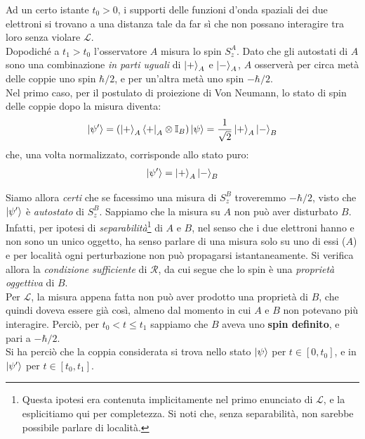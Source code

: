 \documentclass[../../FisicaTeorica.tex]{subfiles}
\begin{document}
Ad un certo istante $t_0 > 0$, i supporti delle funzioni d'onda spaziali dei due elettroni si trovano a una distanza tale da far sì che non possano interagire tra loro senza violare $\mathcal{L}$.\\
Dopodiché a $t_1>t_0$ l'osservatore $A$ misura lo spin $S_z^A$. Dato che gli autostati di $A$ sono una combinazione \textit{in parti uguali} di $\Ket{+}_A$ e $\Ket{-}_A$, $A$ osserverà per circa metà delle coppie uno spin $\hbar/2$, e per un'altra metà uno spin $-\hbar/2$.\\
Nel primo caso, per il postulato di proiezione di Von Neumann, lo stato di spin delle coppie dopo la misura diventa:
\begin{align*}
\Ket{\psi'}=\left(\Ket{+}_A \Bra{+}_A\otimes \mathbb{I}_B\right) \Ket{\psi} = \frac{1}{\sqrt{2}}\Ket{+}_A \Ket{-}_B
\end{align*}
che, una volta normalizzato, corrisponde allo stato puro:
\begin{align*}
\Ket{\psi'} = \Ket{+}_A \Ket{-}_B
\end{align*}

Siamo allora \textit{certi} che se facessimo una misura di $S_z^B$ troveremmo $-\hbar/2$, visto che $\Ket{\psi'}$ è \textit{autostato} di $S_z^B$. Sappiamo che la misura su $A$ non può aver disturbato $B$. Infatti, per ipotesi di \textit{separabilità}\footnote{Questa ipotesi era contenuta implicitamente nel primo enunciato di $\mathcal{L}$, e la esplicitiamo qui per completezza. Si noti che, senza separabilità, non sarebbe possibile parlare di località.} di $A$ e $B$, nel senso che i due elettroni hanno  e non sono un unico oggetto, ha senso parlare di una misura solo su uno di essi ($A$) e per località ogni perturbazione non può propagarsi istantaneamente. Si verifica allora la \textit{condizione sufficiente} di $\mathcal{R}$,
da cui segue che lo spin è una \textit{proprietà oggettiva} di $B$.\\
Per $\mathcal{L}$, la misura appena fatta non può aver prodotto una proprietà di $B$, che quindi doveva essere già così, almeno dal momento in cui $A$ e $B$ non potevano più interagire. Perciò, per $t_0 < t \leq t_1$ sappiamo che $B$ aveva uno \textbf{spin definito}, e pari a $-\hbar/2$.\\
Si ha perciò che la coppia considerata si trova nello stato $\Ket{\psi}$ per $t\in [0,t_0]$, e in $\Ket{\psi'}$ per $t \in [t_0,t_1]$.\\
\end{document}
